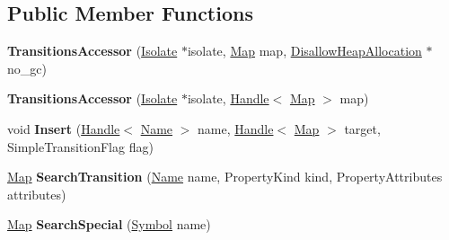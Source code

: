 \subsection*{Public Member Functions}
\begin{DoxyCompactItemize}
\item 
\mbox{\label{classv8_1_1internal_1_1TransitionsAccessor_a3490a8ff22a044300d49532787689227}} 
{\bfseries Transitions\+Accessor} (\mbox{\hyperlink{classv8_1_1internal_1_1Isolate}{Isolate}} $\ast$isolate, \mbox{\hyperlink{classv8_1_1internal_1_1Map}{Map}} map, \mbox{\hyperlink{classv8_1_1internal_1_1PerThreadAssertScopeDebugOnly}{Disallow\+Heap\+Allocation}} $\ast$no\+\_\+gc)
\item 
\mbox{\label{classv8_1_1internal_1_1TransitionsAccessor_afa4453af3d969481ddad6638d92fc9f2}} 
{\bfseries Transitions\+Accessor} (\mbox{\hyperlink{classv8_1_1internal_1_1Isolate}{Isolate}} $\ast$isolate, \mbox{\hyperlink{classv8_1_1internal_1_1Handle}{Handle}}$<$ \mbox{\hyperlink{classv8_1_1internal_1_1Map}{Map}} $>$ map)
\item 
\mbox{\label{classv8_1_1internal_1_1TransitionsAccessor_a62cd4b02d66cbdcca544da96a418c5ab}} 
void {\bfseries Insert} (\mbox{\hyperlink{classv8_1_1internal_1_1Handle}{Handle}}$<$ \mbox{\hyperlink{classv8_1_1internal_1_1Name}{Name}} $>$ name, \mbox{\hyperlink{classv8_1_1internal_1_1Handle}{Handle}}$<$ \mbox{\hyperlink{classv8_1_1internal_1_1Map}{Map}} $>$ target, Simple\+Transition\+Flag flag)
\item 
\mbox{\label{classv8_1_1internal_1_1TransitionsAccessor_a27808b78cf1869d8b46ffca9f67b9679}} 
\mbox{\hyperlink{classv8_1_1internal_1_1Map}{Map}} {\bfseries Search\+Transition} (\mbox{\hyperlink{classv8_1_1internal_1_1Name}{Name}} name, Property\+Kind kind, Property\+Attributes attributes)
\item 
\mbox{\label{classv8_1_1internal_1_1TransitionsAccessor_a857eb1887f98c805017ab410786aac9c}} 
\mbox{\hyperlink{classv8_1_1internal_1_1Map}{Map}} {\bfseries Search\+Special} (\mbox{\hyperlink{classv8_1_1internal_1_1Symbol}{Symbol}} name)
\item 

\end{DoxyCompactItemize}
